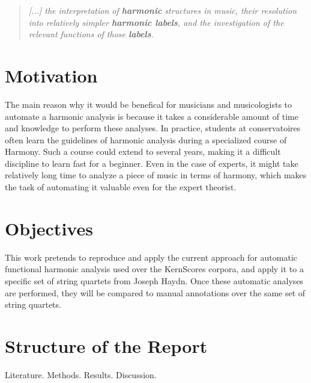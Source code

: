\begin{quote}
\centering
\emph{[...] the interpretation of \textbf{harmonic} structures in music, \linebreak
their resolution into relatively simpler \textbf{harmonic labels}, \linebreak and the investigation of the relevant functions of those \textbf{labels}.}
\end{quote}

\section{Motivation}
The main reason why it would be benefical for musicians and musicologists to automate a harmonic analysis is because it takes a considerable amount of time and knowledge to perform these analyses. In practice, students at conservatoires often learn the guidelines of harmonic analysis during a specialized course of Harmony. Such a course could extend to several years, making it a difficult discipline to learn fast for a beginner. Even in the case of experts, it might take relatively long time to analyze a piece of music in terms of harmony, which makes the task of automating it valuable even for the expert theorist.

\section{Objectives}
This work pretends to reproduce and apply the current approach for automatic functional harmonic analysis used over the KernScores corpora, and apply it to a specific set of string quartets from Joseph Haydn. Once these automatic analyses are performed, they will be compared to manual annotations over the same set of string quartets.

\section{Structure of the Report}
Literature. Methods. Results. Discussion.

\newpage

